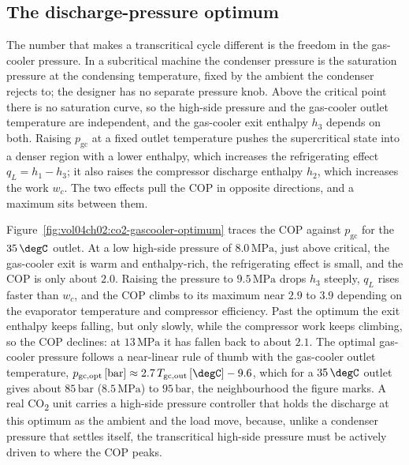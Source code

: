 \subsection{The discharge-pressure optimum}

The number that makes a transcritical cycle different is the freedom in the
gas-cooler pressure. In a subcritical machine the condenser pressure is the
saturation pressure at the condensing temperature, fixed by the ambient the
condenser rejects to; the designer has no separate pressure knob. Above the
critical point there is no saturation curve, so the high-side pressure and
the gas-cooler outlet temperature are independent, and the gas-cooler exit
enthalpy $h_3$ depends on both. Raising $p_{\text{gc}}$ at a fixed outlet
temperature pushes the supercritical state into a denser region with a lower
enthalpy, which increases the refrigerating effect $q_L = h_1 - h_3$; it
also raises the compressor discharge enthalpy $h_2$, which increases the
work $w_c$. The two effects pull the COP in opposite directions, and a
maximum sits between them.

Figure~\ref{fig:vol04ch02:co2-gascooler-optimum} traces the COP against
$p_{\text{gc}}$ for the $35\,\degC$ outlet. At a low high-side pressure of
$8.0\,\text{MPa}$, just above critical, the gas-cooler exit is warm and
enthalpy-rich, the refrigerating effect is small, and the COP is only about
$2.0$. Raising the pressure to $9.5\,\text{MPa}$ drops $h_3$ steeply,
$q_L$ rises faster than $w_c$, and the COP climbs to its maximum near $2.9$
to $3.9$ depending on the evaporator temperature and compressor efficiency.
Past the optimum the exit enthalpy keeps falling, but only slowly, while the
compressor work keeps climbing, so the COP declines: at $13\,\text{MPa}$ it
has fallen back to about $2.1$. The optimal gas-cooler pressure follows a
near-linear rule of thumb with the gas-cooler outlet temperature,
$p_{\text{gc,opt}}\,[\text{bar}] \approx 2.7\,T_{\text{gc,out}}\,[\degC] -
9.6$, which for a $35\,\degC$ outlet gives about $85\,\text{bar}$
($8.5\,\text{MPa}$) to $95\,\text{bar}$, the neighbourhood the figure marks.
A real CO\textsubscript{2} unit carries a high-side pressure controller that
holds the discharge at this optimum as the ambient and the load move,
because, unlike a condenser pressure that settles itself, the transcritical
high-side pressure must be actively driven to where the COP peaks.



